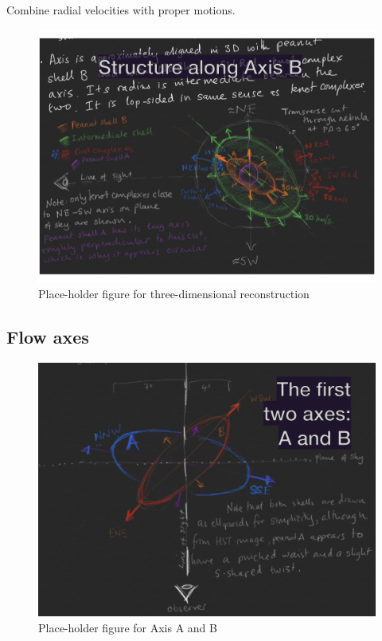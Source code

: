 \documentclass[useAMS, usenatbib, a4paper]{mnras}
\begin{document}
Combine radial velocities with proper motions.

\begin{figure}
  \includegraphics[width=\linewidth]
  {talk-figs/turtle-talk-morelia-2020-02-export-011}
  \caption{Place-holder figure for three-dimensional reconstruction}
  \label{fig:axis-B-3d}
\end{figure}

\subsection{Flow axes}
\label{sec:flow-axes}

\begin{figure}
  \includegraphics[width=\linewidth]
  {talk-figs/turtle-talk-morelia-2020-02-export-010}
  \caption{Place-holder figure for Axis A and B}
  \label{fig:flow-axes-AB}
\end{figure}
\end{document}
